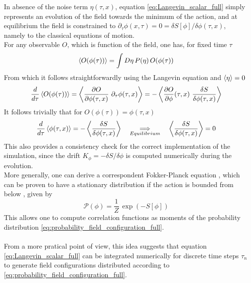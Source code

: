 In absence of the noise term $\eta(\tau,x)$, equation \eqref{eq:Langevin_scalar_full} simply represents an evolution of the field towards the minimum of the action, and at equilibrium the field is constrained to $\partial_\tau \phi(x,\tau) = 0 = \delta S[\phi]/\delta \phi (\tau, x)$, namely to the classical equations of motion.\\
For any observable $O$, which is function of the field, one has, for fixed time $\tau$
\begin{equation*}
    \left\langle O(\phi(\tau)) \right\rangle = \int D\eta \, P(\eta) \, O(\phi(\tau))
\end{equation*}
From which it follows straightforwardly using the Langevin equation and $\left\langle \eta \right\rangle = 0$
\begin{equation*}
    \frac{d}{d\tau} \expect{O(\phi(\tau))} = \expect{\frac{\partial O}{\partial \phi(\tau, x)} \ \partial_\tau \phi(\tau, x)} = -\expect{\frac{\partial O}{\partial \phi}(\tau, x) \ \frac{\delta S}{\delta \phi(\tau, x)}}
\end{equation*}
It follows trivially that for $O(\phi(\tau)) = \phi(\tau, x)$
\begin{equation*}
        \frac{d}{d\tau} \left\langle \phi(\tau, x) \right\rangle = -\left\langle \frac{\delta S}{\delta \phi(\tau, x)} \right\rangle \quad \underset{Equilibrium}{\Longrightarrow} \quad \left\langle \frac{\delta S}{\delta \phi(\tau, x)} \right\rangle = 0
\end{equation*}
This also provides a consistency check for the correct implementation of the simulation, since the drift $K_\phi = -\delta S / \delta \phi$ is computed numerically during the evolution. \\
More generally, one can derive a correspondent Fokker-Planck equation \cite{gardiner}, which can be proven to have a stationary distribution if the action is bounded from below \cite{Damgaard1987StochasticQuantization}, given by
\begin{equation}
    \mathcal{P}(\phi) = \frac{1}{Z} \, \exp\left(-S[\phi]\right)
    \label{eq:probability_field_configuration_full}
\end{equation}
This allows one to compute correlation functions as moments of the  probability distribution \eqref{eq:probability_field_configuration_full}. \\~\\
From a more pratical point of view, this idea suggests that equation \eqref{eq:Langevin_scalar_full} can be integrated numerically for discrete time steps $\tau_n$ to generate field configurations distributed according to \eqref{eq:probability_field_configuration_full}. 

